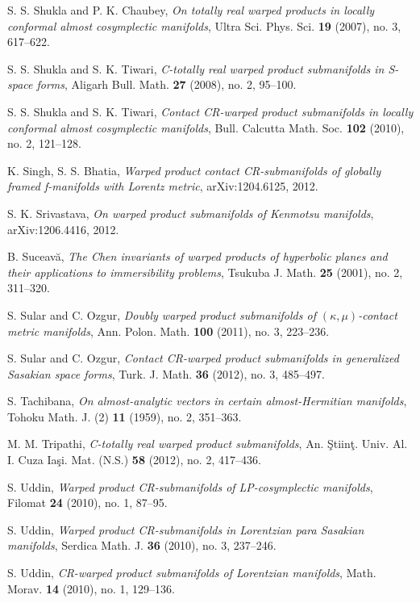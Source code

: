 \documentclass{amsart}
\theoremstyle{plain}
\numberwithin{equation}{section}
\theoremstyle{remark}
\numberwithin{equation}{section}
\begin{document}
\begin{thebibliography}{120}
 S. S. Shukla and P. K. Chaubey, {\it   On totally real warped products in locally conformal almost cosymplectic manifolds}, Ultra Sci. Phys. Sci. {\bf 19} (2007), no. 3, 617--622.

 S. S. Shukla and S. K. Tiwari, {\it  C-totally real warped product submanifolds in S-space forms}, Aligarh Bull. Math. {\bf 27} (2008), no. 2, 95--100.

 S. S. Shukla and S. K. Tiwari, {\it Contact CR-warped product submanifolds in locally conformal almost cosymplectic manifolds}, Bull. Calcutta Math. Soc. {\bf 102} (2010), no. 2, 121--128.

 K. Singh, S. S. Bhatia, {\it Warped product contact CR-submanifolds of globally framed f-manifolds with Lorentz metric},  arXiv:1204.6125, 2012.

 S. K.  Srivastava, {\it On warped product submanifolds of Kenmotsu manifolds}, 	arXiv:1206.4416, 2012.

 B. Suceav\u{a},  {\it The Chen invariants  of warped products of hyperbolic
planes and their applications to immersibility problems},  Tsukuba J. Math. {\bf 25} (2001), no. 2, 311--320.

 S. Sular and C. Ozgur, {\it  Doubly warped product submanifolds of $(\kappa,\mu)$-contact metric manifolds}, Ann. Polon. Math. {\bf 100} (2011), no. 3, 223--236.

 S. Sular and C. Ozgur, {\it Contact CR-warped product submanifolds in generalized Sasakian space forms}, Turk. J. Math. {\bf 36} (2012), no. 3, 485--497.

 S. Tachibana, {\it On almost-analytic vectors in certain almost-Hermitian manifolds}, Tohoku Math. J. (2) {\bf 11} (1959), no. 2, 351--363.

 M. M. Tripathi, {\it C-totally real warped product submanifolds}, An. \c{S}tiin\c{t}. Univ. Al. I. Cuza Ia\c{s}i. Mat. (N.S.) {\bf 58} (2012), no. 2, 417--436.

 S. Uddin, {\it  Warped product CR-submanifolds of LP-cosymplectic manifolds}, Filomat {\bf 24} (2010), no. 1, 87--95.

 S. Uddin, {\it Warped product CR-submanifolds in Lorentzian para Sasakian manifolds},  Serdica Math. J. {\bf 36} (2010), no. 3, 237--246.

 S. Uddin, {\it CR-warped product submanifolds of Lorentzian manifolds}, Math. Morav. {\bf 14} (2010), no. 1, 129--136.


\end{thebibliography}
\end{document}
